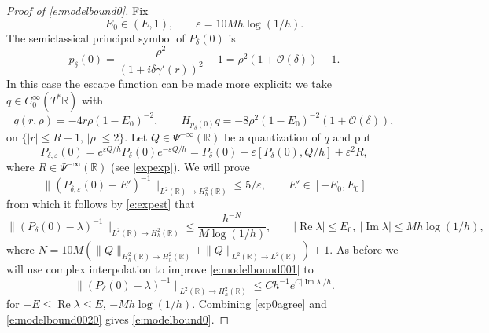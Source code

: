 \documentclass[reqno, 12pt]{amsart}
\newcommand \R {\mathbb{R}}
\newcommand \Oh {\mathcal{O}}
\newcommand \eps {\varepsilon}
\DeclareMathOperator \re {Re}
\DeclareMathOperator \im {Im}
\theoremstyle{definition}
\numberwithin{equation}{section}
\numberwithin{prop}{section}
\numberwithin{figure}{section}
\begin{document}
\begin{proof}[Proof of \eqref{e:modelbound0}]
 Fix 
\[
E_0 \in (E,1), \qquad \eps = 10 M h \log(1/h).
\]
The semiclassical principal symbol of $P_\delta(0)$ is
\begin{equation}\label{e:p0symb}
p_\delta(0) = \frac{\rho^2}{(1+ i\delta \gamma'(r))^2} - 1
= \rho^2(1 + \Oh(\delta)) - 1.
\end{equation}
In this case the escape function can be made more explicit: we  take $q \in C_0^\infty(T^*\R)$ with
\begin{equation}\label{e:hp0q0}
q(r,\rho) = - 4r \rho(1-E_0)^{-2}, \qquad H_{p_\delta(0)} q  = - 8\rho^2(1-E_0)^{-2}(1 + \Oh(\delta)),
\end{equation}
on $\{|r| \le R+1, \, |\rho| \le 2\}$.
Let $Q \in \Psi^{-\infty}(\R)$ be a quantization of $q$ and put
\[
P_{\delta,\eps}(0) = e^{\eps Q/h} P_\delta(0) e^{-\eps Q/h} = P_\delta(0) - \eps[P_\delta(0),Q/h] + \eps^2 R,
\]
where $R \in \Psi^{-\infty}(\R)$ (see \eqref{expexp}).
We will prove
\begin{equation}\label{e:modelbound0eps0}
\|(P_{\delta,\eps}(0) -E')^{-1}\|_{L^2(\R) \to H^2_h(\R)}\le 5/\eps, \qquad E' \in [-E_0,E_0]
\end{equation}
 from which it follows by \eqref{e:expest} that
\begin{equation}\label{e:modelbound001}
\|(P_\delta(0) -\lambda)^{-1}\|_{L^2(\R) \to H^2_h(\R)} \le \frac{h^{-N}}{M\log(1/h)}, \qquad |\re \lambda| \le E_0, \ |\im \lambda| \le M h \log(1/h),
\end{equation}
where $N = 10M(\|Q\|_{H^2_h(\R) \to H^2_h(\R)} + \|Q\|_{L^2(\R) \to L^2(\R)})+1$. As before we will use complex interpolation to improve \eqref{e:modelbound001} to
\begin{equation}\label{e:modelbound0020}
\|(P_\delta(0) -\lambda)^{-1}\|_{L^2(\R) \to H^2_h(\R)}  \le Ch^{-1} e^{C|\im \lambda|/h}.
\end{equation}
for $- E \le \re \lambda \le E$, $- M h \log(1/h)$. Combining  \eqref{e:p0agree} and \eqref{e:modelbound0020} gives \eqref{e:modelbound0}.


\end{proof}
\end{document}
